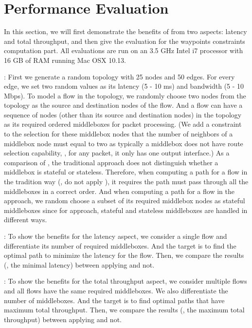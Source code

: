 \section{Performance Evaluation}
\label{sec:eval}

In this section, we will first demonstrate the benefits of \concept{} from two aspects: latency and total throughput, and then give the evaluation for the waypoints constraints computation part. All evaluations are run on an 3.5 GHz Intel i7 processor with 16 GB of RAM running Mac OSX 10.13.

: First we generate a random topology with 25 nodes and 50 edges. For every edge, we set two random values as its latency (5 - 10 ms) and bandwidth (5 - 10 Mbps). To model a flow in the topology, we randomly choose two nodes from the topology as the source and destination nodes of the flow. And a flow can have a sequence of nodes (other than its source and destination nodes) in the topology as its required ordered middleboxes for packet processing. (We add a constraint to the selection for these middlebox nodes that the number of neighbors of a middlebox node must equal to two as typically a middlebox does not have route selection capability, \ie, for any packet, it only has one output interface.) As a comparison of \concept{}, the traditional approach does not distinguish whether a middlebox is stateful or stateless. Therefore, when computing a path for a flow in the tradition way (\ie, do not apply \concept{}), it requires the path must pass through all the middleboxes in a correct order. And when computing a path for a flow in the \concept{} approach, we random choose a subset of its required middlebox nodes as stateful middleboxes since for \concept{} approach, stateful and stateless middleboxes are handled in different ways.

: To show the benefits for the latency aspect, we consider a single flow and differentiate its number of required middleboxes. And the target is to find the optimal path to minimize the latency for the flow. Then, we compare the results (\ie, the minimal latency) between applying \concept{} and not.

: To show the benefits for the total throughput aspect, we consider multiple flows and all flows have the same required middleboxes. We also differentiate the number of middleboxes. And the target is to find optimal paths that have maximum total throughput. Then, we compare the results (\ie, the maximum total throughput) between applying \concept{} and not.


